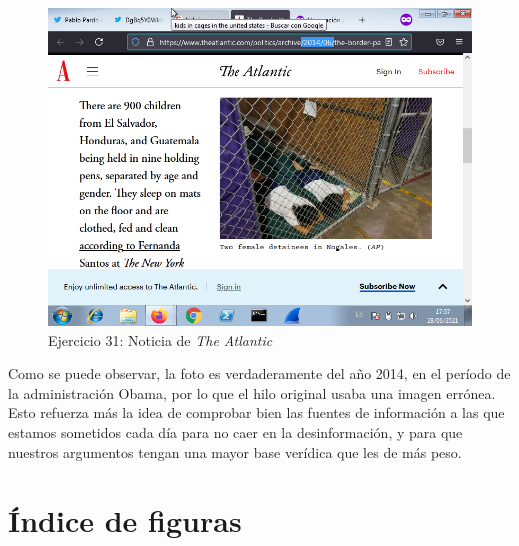 \documentclass[11pt]{article}
\begin{document}
\begin{figure}[H]
    \caption{Ejercicio 31: Noticia de \textit{The Atlantic}}
  \centering
    \includegraphics[scale=0.8]{p05/e31-5.png}
\end{figure}

Como se puede observar, la foto es verdaderamente del año 2014, en el período de la administración Obama, por lo que el hilo original usaba una imagen errónea. Esto refuerza más la idea de comprobar bien las fuentes de información a las que estamos sometidos cada día para no caer en la desinformación, y para que nuestros argumentos tengan una mayor base verídica que les de más peso. 



\newpage

\section{Índice de figuras}

\listoffigures
\end{document}
